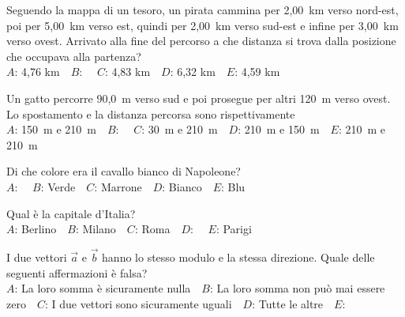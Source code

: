 \def\mcquestionnumber{11}


\mcquestionheader Seguendo la mappa di un tesoro, un pirata cammina per 2,00~km verso nord-est, poi per 5,00~km verso est, quindi per 2,00~km verso sud-est e infine per 3,00~km verso ovest. Arrivato alla fine del percorso a che distanza si trova dalla posizione che occupava alla partenza?\\
{$A$}: 4,76 km\ \ {$B$}: \ \ {$C$}: 4,83 km\ \ {$D$}: 6,32 km\ \ {$E$}: 4,59 km\ \ 

\mcquestionfooter



\def\mcquestionnumber{12}


\mcquestionheader Un gatto percorre 90,0~m verso sud e poi prosegue per altri 120~m verso ovest. Lo spostamento e la distanza percorsa sono rispettivamente\\
{$A$}: 150~m e 210~m\ \ {$B$}: \ \ {$C$}: 30~m e 210~m\ \ {$D$}: 210~m e 150~m\ \ {$E$}: 210~m e 210~m\ \ 

\mcquestionfooter



\mcpaperfooter

\def\mcserialnumber{11}
\mcpaperheader


\def\mcquestionnumber{1}


\mcquestionheader Di che colore era il cavallo bianco di Napoleone?\\
{$A$}: \ \ {$B$}: Verde\ \ {$C$}: Marrone\ \ {$D$}: Bianco\ \ {$E$}: Blu\ \ 

\mcquestionfooter



\def\mcquestionnumber{2}


\mcquestionheader Qual è la capitale d’Italia?\\
{$A$}: Berlino\ \ {$B$}: Milano\ \ {$C$}: Roma\ \ {$D$}: \ \ {$E$}: Parigi\ \ 

\mcquestionfooter



\def\mcquestionnumber{3}


\mcquestionheader I due vettori $\vec{a}$ e $\vec{b}$ hanno lo stesso modulo e la stessa direzione. Quale delle seguenti affermazioni è falsa?\\
{$A$}: La loro somma è sicuramente nulla\ \ {$B$}: La loro somma non può mai essere zero\ \ {$C$}: I due vettori sono sicuramente uguali\ \ {$D$}: Tutte le altre\ \ {$E$}: \ \ 

\mcquestionfooter



